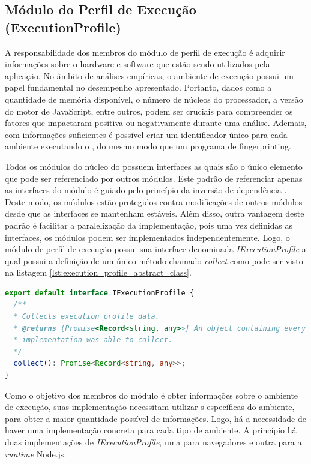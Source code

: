\documentclass[12pt]{tcc}
\begin{document}
	\subsection{Módulo do Perfil de Execução (ExecutionProfile)}
	\label{subsection:modulo-execution-profile}

	
	A responsabilidade dos membros do módulo de perfil de execução é adquirir informações sobre o hardware e software que estão sendo utilizados pela aplicação.
	No âmbito de análises empíricas, o ambiente de execução possui um papel fundamental no desempenho apresentado.
	Portanto, dados como a quantidade de memória disponível, o número de núcleos do processador, a versão do motor de JavaScript, entre outros, podem ser cruciais para compreender os fatores que impactaram positiva ou negativamente durante uma análise.
	Ademais, com informações suficientes é possível criar um identificador único para cada ambiente executando o , do mesmo modo que um programa de fingerprinting.
	
	Todos os módulos do núcleo do  possuem interfaces as quais são o único elemento que pode ser referenciado por outros módulos.
	Este padrão de referenciar apenas as interfaces do módulo é guiado pelo princípio da inversão de dependência \citep{MartinCleanArchtecture2017}.
	Deste modo, os módulos estão protegidos contra modificações de outros módulos desde que as interfaces se mantenham estáveis.
	Além disso, outra vantagem deste padrão é facilitar a paralelização da implementação, pois uma vez definidas as interfaces, os módulos podem ser implementados independentemente.
	Logo, o módulo de perfil de execução possui sua interface denominada \emph{IExecutionProfile} a qual possui a definição de um único método chamado \emph{collect} como pode ser visto na listagem \ref{lst:execution_profile_abstract_class}.

\begin{lstlisting}[label={lst:execution_profile_abstract_class}, caption={[Implementação de um perfil de execução.]Implementação da classe responsável por representar um perfil de execução.}, language=TypeScript, breaklines=true]
export default interface IExecutionProfile {
  /**
  * Collects execution profile data.
  * @returns {Promise<Record<string, any>>} An object containing every execution profile data the
  * implementation was able to collect.
  */
  collect(): Promise<Record<string, any>>;
}
\end{lstlisting}

	Como o objetivo dos membros do módulo é obter informações sobre o ambiente de execução, suas implementação necessitam utilizar s específicas do ambiente, para obter a maior quantidade possível de informações.
	Logo, há a necessidade de haver uma implementação concreta para cada tipo de ambiente.
	A princípio há duas implementações de \emph{IExecutionProfile}, uma para navegadores e outra para a \emph{runtime} Node.js.
\end{document}
